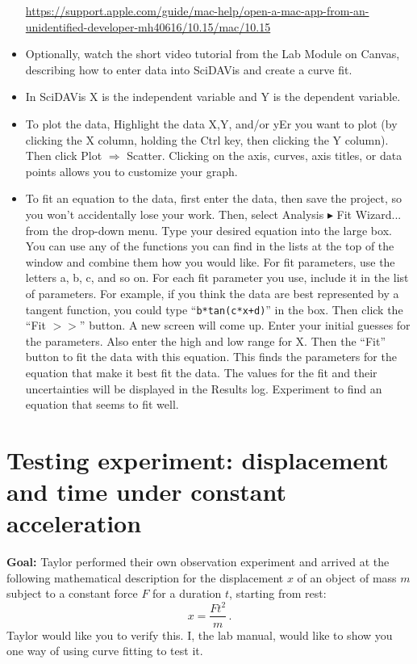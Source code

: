 \begin{steps}
\begin{itemize}
\begin{framed}
			\url{https://support.apple.com/guide/mac-help/open-a-mac-app-from-an-unidentified-developer-mh40616/10.15/mac/10.15}
		\end{framed}
		
		\item Optionally, watch the short video tutorial from the Lab Module on Canvas, describing how to enter data into SciDAVis and create a curve fit.
		
		\item In SciDAVis X is the independent variable and Y is the dependent variable.
		
		\item To plot the data, Highlight the data X,Y, and/or yEr you want to plot (by clicking the X column, holding the Ctrl key, then clicking the Y column).  Then click Plot $\Rightarrow$ Scatter. Clicking on the axis, curves, axis titles, or data points allows you to customize your graph.
		
		\item To fit an equation to the data, first enter the data, then save the project, so you won't accidentally lose your work. Then, select Analysis $\blacktriangleright$ Fit Wizard... from the drop-down menu. Type your desired equation into the large box. You can use any of the functions you can find in the lists at the top of the window and combine them how you would like. For fit parameters, use the letters a, b, c, and so on. For each fit parameter you use, include it in the list of parameters. For example, if you think the data are best represented by a tangent function, you could type ``\texttt{b*tan(c*x+d)}'' in the box. Then click the ``Fit $>>$'' button. A new screen will come up.  Enter your initial guesses for the parameters.  Also enter the high and low range for X. Then the ``Fit'' button to fit the data with this equation. This finds the parameters for the equation that make it best fit the data. The values for the fit and their uncertainties will be displayed in the Results log. Experiment to find an equation that seems to fit well.
	\end{itemize}
\end{steps}

\section{Testing experiment: displacement and time under constant acceleration}

\textbf{Goal:} Taylor performed their own observation experiment and arrived at the following mathematical description for the displacement $x$ of an object of mass $m$ subject to a constant force $F$ for a duration $t$, starting from rest:
\begin{equation}
 x = \frac{F t^2}{m} \,.
\end{equation}
Taylor would like you to verify this. I, the lab manual, would like to show you one way of using curve fitting to test it.

